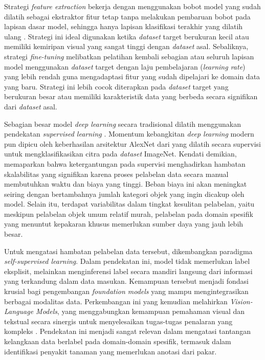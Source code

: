 Strategi \textit{feature extraction} bekerja dengan menggunakan bobot model yang sudah dilatih sebagai ekstraktor fitur tetap tanpa melakukan pembaruan bobot pada lapisan dasar model, sehingga hanya lapisan klasifikasi terakhir yang dilatih ulang \parencite{cholletDeepLearningPython2026}. Strategi ini ideal digunakan ketika \textit{dataset} target berukuran kecil atau memiliki kemiripan visual yang sangat tinggi dengan \textit{dataset} asal. Sebaliknya, strategi \textit{fine-tuning} melibatkan pelatihan kembali sebagian atau seluruh lapisan model menggunakan \textit{dataset} target dengan laju pembelajaran (\textit{learning rate}) yang lebih rendah guna mengadaptasi fitur yang sudah dipelajari ke domain data yang baru. Strategi ini lebih cocok diterapkan pada \textit{dataset} target yang berukuran besar atau memiliki karakteristik data yang berbeda secara signifikan dari \textit{dataset} asal.

Sebagian besar model \textit{deep learning} secara tradisional dilatih menggunakan pendekatan \textit{supervised learning} \parencite{goodfellowDeepLearning2016}. Momentum kebangkitan \textit{deep learning} modern pun dipicu oleh keberhasilan arsitektur AlexNet dari \textcite{krizhevskyImageNetClassificationDeep2017} yang dilatih secara supervisi untuk mengklasifikasikan citra pada \textit{dataset} ImageNet. Kendati demikian, \textcite{huyenAIEngineeringBuilding2025} memaparkan bahwa ketergantungan pada supervisi menghadirkan hambatan skalabilitas yang signifikan karena proses pelabelan data secara manual membutuhkan waktu dan biaya yang tinggi. Beban biaya ini akan meningkat seiring dengan bertambahnya jumlah kategori objek yang ingin dicakup oleh model. Selain itu, terdapat variabilitas dalam tingkat kesulitan pelabelan, yaitu meskipun pelabelan objek umum relatif murah, pelabelan pada domain spesifik yang menuntut kepakaran khusus memerlukan sumber daya yang jauh lebih besar.

Untuk mengatasi hambatan pelabelan data tersebut, dikembangkan paradigma \textit{self-supervised learning}. Dalam pendekatan ini, model tidak memerlukan label eksplisit, melainkan menginferensi label secara mandiri langsung dari informasi yang terkandung dalam data masukan. Kemampuan tersebut menjadi fondasi krusial bagi pengembangan \textit{foundation models} yang mampu mengintegrasikan berbagai modalitas data. Perkembangan ini yang kemudian melahirkan \textit{Vision-Language Models}, yang menggabungkan kemampuan pemahaman visual dan tekstual secara sinergis untuk menyelesaikan tugas-tugas penalaran yang kompleks \parencite{bordesIntroductionVisionLanguageModeling2024}. Pendekatan ini menjadi sangat relevan dalam mengatasi tantangan kelangkaan data berlabel pada domain-domain spesifik, termasuk dalam identifikasi penyakit tanaman yang memerlukan anotasi dari pakar.


